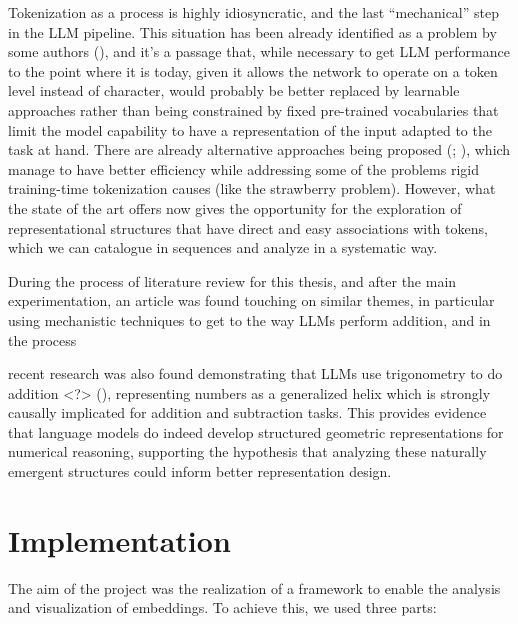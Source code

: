 \documentclass[
  a4paper, twoside, 10pt, titlepage]{book}
\begin{document}
Tokenization as a process is highly idiosyncratic, and the last
``mechanical'' step in the LLM pipeline. This situation has been already
identified as a problem by some authors
(), and it's a
passage that, while necessary to get LLM performance to the point where
it is today, given it allows the network to operate on a token level
instead of character, would probably be better replaced by learnable
approaches rather than being constrained by fixed pre-trained
vocabularies that limit the model capability to have a representation of
the input adapted to the task at hand. There are already alternative
approaches being proposed (;
), which manage to have
better efficiency while addressing some of the problems rigid
training-time tokenization causes (like the strawberry problem).
However, what the state of the art offers now gives the opportunity for
the exploration of representational structures that have direct and easy
associations with tokens, which we can catalogue in sequences and
analyze in a systematic way.

During the process of literature review for this thesis, and after the
main experimentation, an article was found touching on similar themes,
in particular using mechanistic techniques to get to the way LLMs
perform addition, and in the process

recent research was also found demonstrating that LLMs use trigonometry
to do addition \textless?\textgreater{}
(),
representing numbers as a generalized helix which is strongly causally
implicated for addition and subtraction tasks. This provides evidence
that language models do indeed develop structured geometric
representations for numerical reasoning, supporting the hypothesis that
analyzing these naturally emergent structures could inform better
representation design.

\chapter{Implementation}\label{implementation}

The aim of the project was the realization of a framework to enable the
analysis and visualization of embeddings. To achieve this, we used three
parts:
\end{document}
